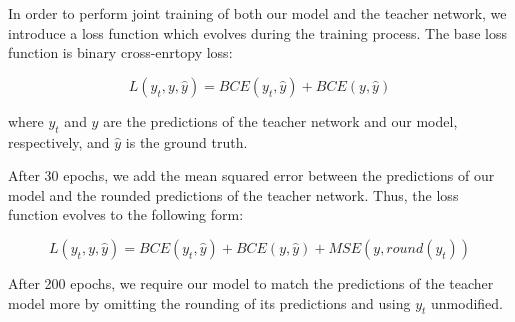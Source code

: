 In order to perform joint training of both our model and the teacher network,
we introduce a loss function which evolves during the training process.
The base loss function is binary cross-enrtopy loss:

\[
    L(y_{t}, y, \hat{y}) = BCE(y_{t}, \hat{y}) + BCE(y, \hat{y})
\]

where $y_{t}$ and $y$ are the predictions of the teacher network and our model, respectively,
and $\hat{y}$ is the ground truth.

After 30 epochs, we add the mean squared error between the predictions of our model
and the rounded predictions of the teacher network.
Thus, the loss function evolves to the following form:

\[
    L(y_{t}, y, \hat{y}) = BCE(y_{t}, \hat{y}) + BCE(y, \hat{y}) + MSE(y, round(y_t))
\]

After 200 epochs, we require our model to match the predictions of the teacher model more by
omitting the rounding of its predictions and using $y_t$ unmodified.